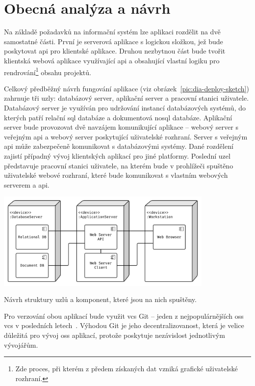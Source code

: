 \chapter{Obecná analýza a návrh}

Na základě požadavků na informační systém lze aplikaci rozdělit na dvě samostatné části. První je serverová aplikace s logickou složkou, jež bude poskytovat \gls{api} pro klientské aplikace. Druhou nezbytnou část bude tvořit klientská webová aplikace využívající \gls{api} a obsahující vlastní logiku pro rendrování\footnote{Zde proces, při kterém z předem získaných dat vzniká grafické uživatelské rozhraní.} obsahu projektů.

Celkový předběžný návrh fungování aplikace (viz obrázek~\ref{pic:dia-deploy-sketch}) zahrnuje tři uzly: databázový server, aplikační server a pracovní stanici uživatele. Databázový server je využíván pro udržování instancí databázových systémů, do kterých patří relační \gls{sql} databáze a dokumentová \gls{nosql} databáze. Aplikační server bude provozovat dvě navzájem komunikující aplikace -- webový server s veřejným \gls{api} a webový server poskytující uživatelské rozhraní. Server s veřejným \gls{api} může zabezpečeně komunikovat s databázovými systémy. Dané rozdělení zajistí případný vývoj klientských aplikací pro jiné platformy. Poslední uzel představuje pracovní stanici uživatele, na kterém bude v prohlížeči spuštěno uživatelské webové rozhraní, které bude komunikovat s vlastním webových serverem a \gls{api}.

\begin{fig:illustration}
   \includegraphics[width=0.8\textwidth]{images/dia-deploy-sketch.pdf}
   \caption{Návrh struktury uzlů a komponent, které jsou na nich spuštěny.}\label{pic:dia-deploy-sketch}
\end{fig:illustration}

Pro verzování obou aplikací bude využit \gls{vcs} Git -- jeden z nejpopulárnějších \gls{oss} \gls{vcs} v posledních letech~\cite{vcsG2}. Výhodou Git je jeho decentralizovanost, která je velice důležitá pro vývoj \gls{oss} aplikací, protože poskytuje nezávislost jednotlivým vývojářům.



